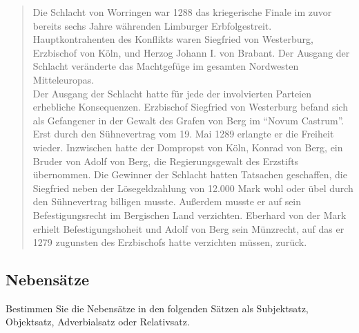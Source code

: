 \documentclass[12pt,a4paper,twoside]{article}
\begin{document}
\begin{quote}
  \onehalfspacing
  Die Schlacht von Worringen war 1288 das kriegerische Finale im zuvor bereits sechs Jahre währenden Limburger Erbfolgestreit.
  Hauptkontrahenten des Konflikts waren Siegfried von Westerburg, Erzbischof von Köln, und Herzog Johann I. von Brabant.
  Der Ausgang der Schlacht veränderte das Machtgefüge im gesamten Nordwesten Mitteleuropas.\\
  Der Ausgang der Schlacht hatte für jede der involvierten Parteien erhebliche Konsequenzen.
  Erzbischof Siegfried von Westerburg befand sich als Gefangener in der Gewalt des Grafen von Berg im "`Novum Castrum"'.
  Erst durch den Sühnevertrag vom 19. Mai 1289 erlangte er die Freiheit wieder.
  Inzwischen hatte der Dompropst von Köln, Konrad von Berg, ein Bruder von Adolf von Berg, die Regierungsgewalt des Erzstifts übernommen.
  Die Gewinner der Schlacht hatten Tatsachen geschaffen, die Siegfried neben der Lösegeldzahlung von 12.000 Mark wohl oder übel durch den Sühnevertrag billigen musste.
  Außerdem musste er auf sein Befestigungsrecht im Bergischen Land verzichten.
  Eberhard von der Mark erhielt Befestigungshoheit und Adolf von Berg sein Münzrecht, auf das er 1279 zugunsten des Erzbischofs hatte verzichten müssen, zurück.
\end{quote}


\subsection{Nebensätze}

Bestimmen Sie die Nebensätze in den folgenden Sätzen als Subjektsatz, Objektsatz, Adverbialsatz oder Relativsatz.
\end{document}
